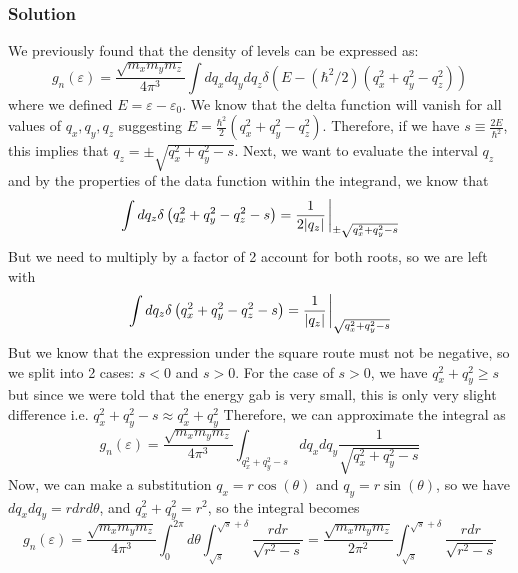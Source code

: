 \documentclass[12pt]{article}
\begin{document}
\subsubsection{Solution}
We previously found that the density of levels can be expressed as:
\begin{equation}
    g_n(\varepsilon) = \frac{\sqrt{m_x m_y m_z}}{4 \pi^3}\int dq_x dq_y dq_z \delta\left(E-\left(\hbar^2 / 2\right)\left(q_x^2 + q_y^2 - q_z^2\right)\right)
\end{equation}
where we defined $E = \varepsilon - \varepsilon_0$. We know that the delta function will vanish for all values of $q_x, q_y, q_z$ suggesting $E=\frac{\hbar^{2}}{2} \left(q_x^2 + q_y^2 - q_z^2\right)$. Therefore, if we have $s\equiv \frac{2E}{\hbar^{2}}$, this implies that $q_z = \pm \sqrt{q_x^2 + q_y^2 - s}$. Next, we want to evaluate the interval $q_z$ and by the properties of the data function within the integrand, we know that
\begin{equation}
    \int dq_z \delta\left(q_x^2 + q_y^2 - q_z^2 -s \right) = \frac{1}{2|q_z|} \eval_{\pm \sqrt{q_x^2 + q_y^2 - s}}
\end{equation}
But we need to multiply by a factor of 2 account for both roots, so we are left with
\begin{equation}
    \int dq_z \delta\left(q_x^2 + q_y^2 - q_z^2 -s \right) = \frac{1}{|q_z|} \eval_{\sqrt{q_x^2 + q_y^2 - s}}
\end{equation}
But we know that the expression under the square route must not be negative, so we split into 2 cases: $s < 0$ and $s > 0$. For the case of $s > 0$, we have $q_x^2 + q_y^2 \geq s$ but since we were told that the energy gab is very small, this is only very slight difference i.e. $q_x^2 + q_y^2 -s \approx q_x^2 + q_y^2$ Therefore, we can approximate the integral as
\begin{equation}
    g_n(\varepsilon) = \frac{\sqrt{m_x m_y m_z}}{4 \pi^3}\int_{q_x^2 + q_y^2 -s} dq_x dq_y \frac{1}{\sqrt{q_x^2 + q_y^2 - s}}
\end{equation}
Now, we can make a substitution $q_x = r\cos(\theta)$ and $q_y = r\sin(\theta)$, so we have $dq_x dq_y = r dr d\theta$, and $q_x^2 + q_y^2 = r^2$, so the integral becomes
\begin{equation}
    g_n(\varepsilon) = \frac{\sqrt{m_x m_y m_z}}{4 \pi^3}\int_{0}^{2\pi} d\theta \int_{\sqrt{s}}^{\sqrt{s} + \delta} \frac{r dr}{\sqrt{r^2 - s}} = \frac{\sqrt{m_x m_y m_z}}{2 \pi^2}\int_{\sqrt{s}}^{\sqrt{s} + \delta} \frac{rdr}{\sqrt{r^2 - s}}
\end{equation}
\end{document}
